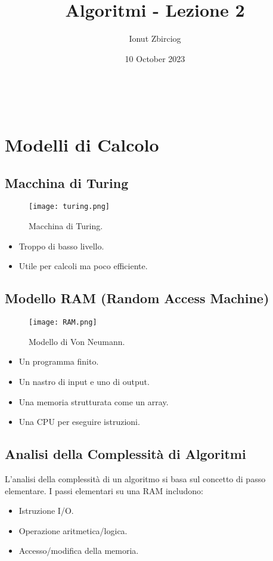 \documentclass{article}
\title{Algoritmi - Lezione 2}
\author{Ionut Zbirciog}
\date{10 October 2023}
\begin{document}
\maketitle

\

\section{Modelli di Calcolo}

\subsection{Macchina di Turing}
\begin{figure}[h]
  \centering
  \texttt{[image: turing.png]}
  \caption{Macchina di Turing.}
\end{figure}
\begin{itemize}
    \item Troppo di basso livello.
    \item Utile per calcoli ma poco efficiente.
\end{itemize}

\subsection{Modello RAM (Random Access Machine)}
\begin{figure}[h]
  \centering
  \texttt{[image: RAM.png]}
  \caption{Modello di Von Neumann.}
\end{figure}
\begin{itemize}
    \item Un programma finito.
    \item Un nastro di input e uno di output.
    \item Una memoria strutturata come un array.
    \item Una CPU per eseguire istruzioni.
\end{itemize}

\subsection{Analisi della Complessità di Algoritmi}
L'analisi della complessità di un algoritmo si basa sul concetto di passo elementare. I passi elementari su una RAM includono:
\begin{itemize}
    \item Istruzione I/O.
    \item Operazione aritmetica/logica.
    \item Accesso/modifica della memoria.
\end{itemize}
\end{document}
